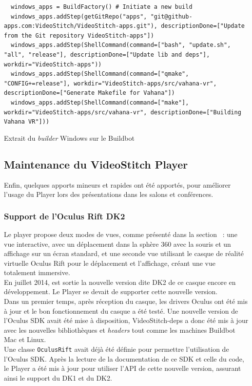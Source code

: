 \begin{listing}
  \begin{verbatim}
  windows_apps = BuildFactory() # Initiate a new build
  windows_apps.addStep(getGitRepo("apps", "git@github-apps.com:VideoStitch/VideoStitch-apps.git"), descriptionDone=["Update from the Git repository VideoStitch-apps"])
  windows_apps.addStep(ShellCommand(command=["bash", "update.sh", "all", "release"], descriptionDone=["Update lib and deps"], workdir="VideoStitch-apps"))
  windows_apps.addStep(ShellCommand(command=["qmake", "CONFIG+=release"], workdir="VideoStitch-apps/src/vahana-vr", descriptionDone=["Generate Makefile for Vahana"])
  windows_apps.addStep(ShellCommand(command=["make"], workdir="VideoStitch-apps/src/vahana-vr", descriptionDone=["Building Vahana VR"]))
  \end{verbatim}
  \caption{Extrait du \textit{builder} Windows sur le Buildbot}
  \label{windows-apps}
\end{listing}

\subsection{Maintenance du VideoStitch Player}
Enfin, quelques apports mineurs et rapides ont été apportés, pour améliorer l'usage
du Player lors des présentations dans les salons et conférences.
\subsubsection{Support de l'Oculus Rift DK2}
Le player propose deux modes de vues, comme présenté dans la section ~:
une vue interactive, avec un déplacement dans la sphère 360 avec la souris et un affichage
sur un écran standard, et une seconde vue utilisant le casque de réalité virtuelle 
Oculus Rift pour le déplacement et l'affichage, créant une vue totalement immersive.\\
En juillet 2014\cite{dk2s-now-shipping}, est sortie la nouvelle version dite DK2 de ce casque encore
en développement. Le Player se devait de supporter cette nouvelle version.\\
Dans un premier temps, après réception du casque, les drivers Oculus ont été mis à
jour et le bon fonctionnement du casque a été testé. Une nouvelle version de l'Oculus
SDK avait été mise à disposition, VideoStitch-deps a donc été mis à jour avec les nouvelles
bibliothèques et \textit{headers} tout comme les machines Buildbot Mac et Linux.\\
\newline
Une classe \texttt{OculusRift} avait déjà été définie pour permettre l'utilisation
de l'Oculus SDK. Après la lecture de la documentation de ce SDK et celle du code,
le Player a été mis à jour pour utiliser l'API de cette nouvelle version, assurant
ainsi le support du DK1 et du DK2.

